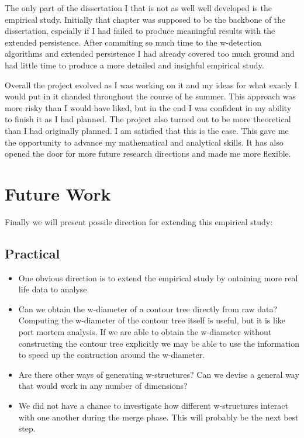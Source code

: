 The only part of the dissertation I that is not as well well developed is the empirical study. Initially that chapter was supposed to be the backbone of the dissertation, espcially if I had failed to produce meaningful results with the extended persistence. After commiting so much time to the w-detection algorithms and extended persistence I had already covered too much ground and had little time to produce a more detailed and insighful empirical study.

Overall the project evolved as I was working on it and my ideas for what exacly I would put in it chanded throughout the course of he summer. This approach was more risky than I would have liked, but in the end I was confident in my ability to finish it as I had planned. The project also turned out to be more theoretical than I had originally planned. I am satisfied that this is the case. This gave me the opportunity to advance my mathematical and analytical skills. It has also opened the door for more future research directions and made me more flexible.



\section{Future Work}

Finally we will present possile direction for extending this empirical study:

\subsection{Practical}

\begin{itemize}
    \item One obvious direction is to extend the empirical study by ontaining more real life data to analyse.

    \item Can we obtain the w-diameter of a contour tree directly from raw data? Computing the w-diameter of the contour tree itself is useful, but it is like port mortem analysis. If we are able to obtain the w-diameter without constructing the contour tree explicitly we may be able to use the information to speed up the contruction around the w-diameter.

    \item Are there other ways of generating w-structures? Can we devise a general way that would work in any number of dimensions?

    \item We did not have a chance to investigate how different w-structures interact with one another during the merge phase. This will probably be the next best step.

\end{itemize}

